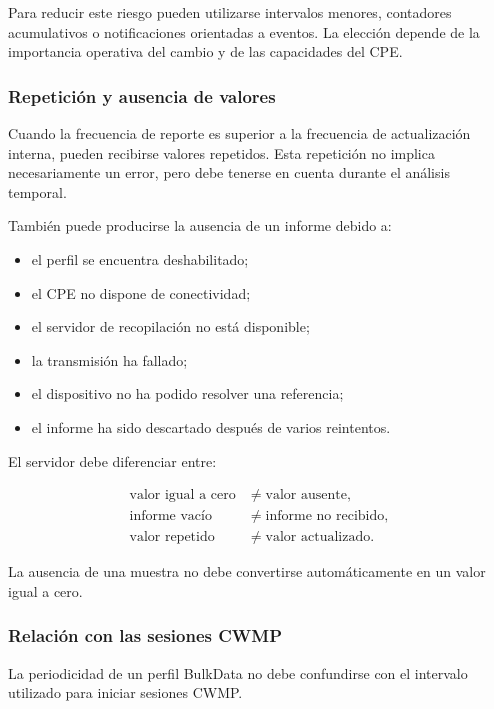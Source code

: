 Para reducir este riesgo pueden utilizarse intervalos menores, contadores
acumulativos o notificaciones orientadas a eventos. La elección depende de
la importancia operativa del cambio y de las capacidades del CPE.


\subsubsection*{Repetición y ausencia de valores}

Cuando la frecuencia de reporte es superior a la frecuencia de
actualización interna, pueden recibirse valores repetidos. Esta repetición
no implica necesariamente un error, pero debe tenerse en cuenta durante
el análisis temporal.

También puede producirse la ausencia de un informe debido a:

\begin{itemize}
    \item el perfil se encuentra deshabilitado;
    \item el CPE no dispone de conectividad;
    \item el servidor de recopilación no está disponible;
    \item la transmisión ha fallado;
    \item el dispositivo no ha podido resolver una referencia;
    \item el informe ha sido descartado después de varios reintentos.
\end{itemize}

El servidor debe diferenciar entre:

\[
\begin{aligned}
    \text{valor igual a cero}
    &\neq
    \text{valor ausente},\\
    \text{informe vacío}
    &\neq
    \text{informe no recibido},\\
    \text{valor repetido}
    &\neq
    \text{valor actualizado}.
\end{aligned}
\]

La ausencia de una muestra no debe convertirse automáticamente en un
valor igual a cero.


\subsubsection*{Relación con las sesiones CWMP}

La periodicidad de un perfil BulkData no debe confundirse con el
intervalo utilizado para iniciar sesiones CWMP.

